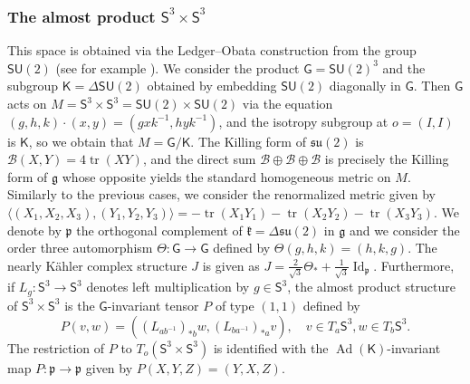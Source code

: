 \documentclass[11pt,a4paper,final]{amsart}
\newcommand{\s}{\mathsf}
\newcommand{\g}{\mathfrak}
\newcommand{\Ad}{\operatorname{Ad}}
\theoremstyle{definition}
\begin{document}
\subsubsection{The almost product $\mathsf{S}^{3}\times\mathsf{S}^{3}$}\label{subsection:S3S3Description}
This space is obtained via the Ledger--Obata construction from the group $\mathsf{SU}(2)$ (see for example \cite{LedgerObata}).
We consider the product $\mathsf{G}=\mathsf{SU}(2)^3$ and the subgroup $\mathsf{K}=\Delta\mathsf{SU}(2)$ obtained by embedding $\mathsf{SU}(2)$ diagonally in $\mathsf{G}$.
Then $\mathsf{G}$ acts on $M=\mathsf{S}^{3}\times\mathsf{S}^{3}=\mathsf{SU}(2)\times\mathsf{SU}(2)$ via the equation $(g,h,k)\cdot(x,y)=(gxk^{-1},hyk^{-1})$, and the isotropy subgroup at $o=(I,I)$ is $\mathsf{K}$, so we obtain that $M=\mathsf{G}/\mathsf{K}$.
The Killing form of $\g{su}(2)$ is $\mathcal{B}(X,Y)=4\operatorname{tr}(XY)$, and the direct sum $\mathcal{B}\oplus\mathcal{B}\oplus\mathcal{B}$ is precisely the Killing form of $\g{g}$ whose opposite yields the standard homogeneous metric on $M$.
Similarly to the previous cases, we consider the renormalized metric given by $\langle (X_{1},X_{2},X_{3}),(Y_{1},Y_{2},Y_{3}) \rangle=-\operatorname{tr}(X_{1} Y_{1})-\operatorname{tr}(X_{2}Y_{2})-\operatorname{tr}(X_{3}Y_{3})$.
We denote by $\g{p}$ the orthogonal complement of $\g{k}=\Delta\g{su}(2)$ in $\g{g}$ and we consider the order three automorphism $\Theta\colon \mathsf{G}\to\mathsf{G}$ defined by $\Theta(g,h,k)=(h,k,g)$.
The nearly Kähler complex structure $J$ is given as $J=\frac{2}{\sqrt{3}}\Theta_{*}+\frac{1}{\sqrt{3}}\operatorname{Id}_{\g{p}}$.
Furthermore, if $L_{g}\colon \s{S}^{3}\to\s{S}^{3}$ denotes left multiplication by $g\in\s{S}^{3}$, the almost product structure of $\s{S}^{3}\times\s{S}^{3}$ is the $\s{G}$-invariant tensor $P$ of type $(1,1)$ defined by
\begin{equation*}
	P(v,w)=\left(\left(L_{ab^{-1}}\right)_{*b}w,\left(L_{ba^{-1}}\right)_{*a}v\right), \quad v\in T_{a}\s{S}^{3},w\in T_{b}\s{S}^{3}.
\end{equation*}
The restriction of $P$ to $T_{o}(\s{S}^{3}\times\s{S}^{3})$ is identified with the $\Ad(\s{K})$-invariant map $P\colon \g{p}\to \g{p}$ given by $P(X,Y,Z)=(Y,X,Z)$.
	
\end{document}
